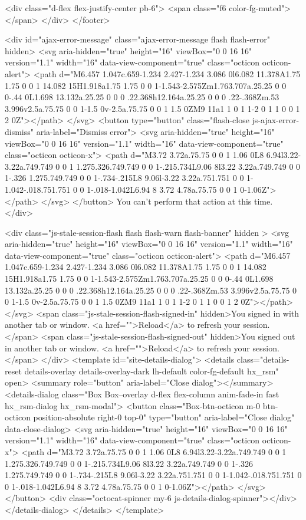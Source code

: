   <div class="d-flex flex-justify-center pb-6">
    <span class="f6 color-fg-muted"></span>
  </div>
</footer>




  <div id="ajax-error-message" class="ajax-error-message flash flash-error" hidden>
    <svg aria-hidden="true" height="16" viewBox="0 0 16 16" version="1.1" width="16" data-view-component="true" class="octicon octicon-alert">
    <path d="M6.457 1.047c.659-1.234 2.427-1.234 3.086 0l6.082 11.378A1.75 1.75 0 0 1 14.082 15H1.918a1.75 1.75 0 0 1-1.543-2.575Zm1.763.707a.25.25 0 0 0-.44 0L1.698 13.132a.25.25 0 0 0 .22.368h12.164a.25.25 0 0 0 .22-.368Zm.53 3.996v2.5a.75.75 0 0 1-1.5 0v-2.5a.75.75 0 0 1 1.5 0ZM9 11a1 1 0 1 1-2 0 1 1 0 0 1 2 0Z"></path>
</svg>
    <button type="button" class="flash-close js-ajax-error-dismiss" aria-label="Dismiss error">
      <svg aria-hidden="true" height="16" viewBox="0 0 16 16" version="1.1" width="16" data-view-component="true" class="octicon octicon-x">
    <path d="M3.72 3.72a.75.75 0 0 1 1.06 0L8 6.94l3.22-3.22a.749.749 0 0 1 1.275.326.749.749 0 0 1-.215.734L9.06 8l3.22 3.22a.749.749 0 0 1-.326 1.275.749.749 0 0 1-.734-.215L8 9.06l-3.22 3.22a.751.751 0 0 1-1.042-.018.751.751 0 0 1-.018-1.042L6.94 8 3.72 4.78a.75.75 0 0 1 0-1.06Z"></path>
</svg>
    </button>
    You can’t perform that action at this time.
  </div>

  <div class="js-stale-session-flash flash flash-warn flash-banner" hidden
    >
    <svg aria-hidden="true" height="16" viewBox="0 0 16 16" version="1.1" width="16" data-view-component="true" class="octicon octicon-alert">
    <path d="M6.457 1.047c.659-1.234 2.427-1.234 3.086 0l6.082 11.378A1.75 1.75 0 0 1 14.082 15H1.918a1.75 1.75 0 0 1-1.543-2.575Zm1.763.707a.25.25 0 0 0-.44 0L1.698 13.132a.25.25 0 0 0 .22.368h12.164a.25.25 0 0 0 .22-.368Zm.53 3.996v2.5a.75.75 0 0 1-1.5 0v-2.5a.75.75 0 0 1 1.5 0ZM9 11a1 1 0 1 1-2 0 1 1 0 0 1 2 0Z"></path>
</svg>
    <span class="js-stale-session-flash-signed-in" hidden>You signed in with another tab or window. <a href="">Reload</a> to refresh your session.</span>
    <span class="js-stale-session-flash-signed-out" hidden>You signed out in another tab or window. <a href="">Reload</a> to refresh your session.</span>
  </div>
    <template id="site-details-dialog">
  <details class="details-reset details-overlay details-overlay-dark lh-default color-fg-default hx_rsm" open>
    <summary role="button" aria-label="Close dialog"></summary>
    <details-dialog class="Box Box--overlay d-flex flex-column anim-fade-in fast hx_rsm-dialog hx_rsm-modal">
      <button class="Box-btn-octicon m-0 btn-octicon position-absolute right-0 top-0" type="button" aria-label="Close dialog" data-close-dialog>
        <svg aria-hidden="true" height="16" viewBox="0 0 16 16" version="1.1" width="16" data-view-component="true" class="octicon octicon-x">
    <path d="M3.72 3.72a.75.75 0 0 1 1.06 0L8 6.94l3.22-3.22a.749.749 0 0 1 1.275.326.749.749 0 0 1-.215.734L9.06 8l3.22 3.22a.749.749 0 0 1-.326 1.275.749.749 0 0 1-.734-.215L8 9.06l-3.22 3.22a.751.751 0 0 1-1.042-.018.751.751 0 0 1-.018-1.042L6.94 8 3.72 4.78a.75.75 0 0 1 0-1.06Z"></path>
</svg>
      </button>
      <div class="octocat-spinner my-6 js-details-dialog-spinner"></div>
    </details-dialog>
  </details>
</template>

